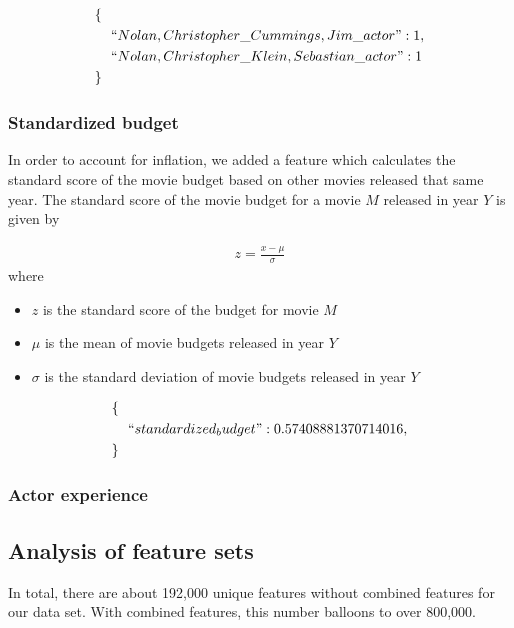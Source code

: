 \documentclass[journal]{IEEEtran}
\begin{document}
\begin{align*}
        \{\ \ &\\
        &``Nolan,Christopher\_Cummings,Jim\_actor": 1,\\
        &``Nolan,Christopher\_Klein,Sebastian\_actor": 1\\
        \}\ \ &
\end{align*}

\subsubsection{Standardized budget}
In order to account for inflation, we added a feature which calculates the
standard score of the movie budget based on other movies released that same
year.  The standard score of the movie budget for a movie $M$ released in year
$Y$ is given by

\begin{eqnarray*}
    z = \frac{x - \mu}{\sigma}
\end{eqnarray*}
where
\begin{itemize}
    \item $z$ is the standard score of the budget for movie $M$
    \item $\mu$ is the mean of movie budgets released in year $Y$
    \item $\sigma$ is the standard deviation of movie budgets released in year $Y$
\end{itemize}
\begin{align*}
        \{\ \ &\\
        &``standardized_budget": 0.57408881370714016,\\
        \}\ \ &
\end{align*}

\subsubsection{Actor experience}

\subsection{Analysis of feature sets}
In total, there are about 192,000 unique features without combined features for
our data set.  With combined features, this number balloons to over 800,000.
\end{document}
